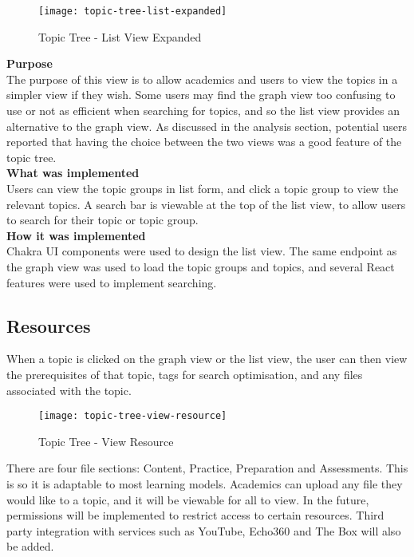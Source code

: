 \begin{figure}[h!]
    \centering
    \texttt{[image: topic-tree-list-expanded]}
    \caption{Topic Tree - List View Expanded}
\end{figure}

\textbf{Purpose} \\
The purpose of this view is to allow academics and users to view the topics in a simpler view if they wish. Some users may find the graph view too confusing to use or not as efficient when searching for topics, and so the list view provides an alternative to the graph view. As discussed in the analysis section, potential users reported that having the choice between the two views was a good feature of the topic tree.\\

\textbf{What was implemented} \\
Users can view the topic groups in list form, and click a topic group to view the relevant topics. A search bar is viewable at the top of the list view, to allow users to search for their topic or topic group.\\

\textbf{How it was implemented} \\
Chakra UI components were used to design the list view. The same endpoint as the graph view was used to load the topic groups and topics, and several React features were used to implement searching.

\subsection{Resources}

When a topic is clicked on the graph view or the list view, the user can then view the prerequisites of that topic, tags for search optimisation, and any files associated with the topic.

\begin{figure}[h!]
    \centering
    \texttt{[image: topic-tree-view-resource]}
    \caption{Topic Tree - View Resource}
\end{figure}

There are four file sections: Content, Practice, Preparation and Assessments. This is so it is adaptable to most learning models. Academics can upload any file they would like to a topic, and it will be viewable for all to view. In the future, permissions will be implemented to restrict access to certain resources. Third party integration with services such as YouTube, Echo360 and The Box will also be added.\\

